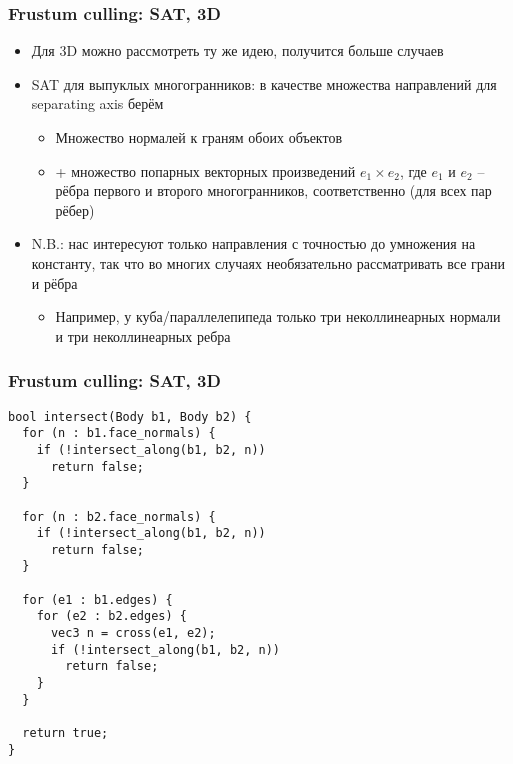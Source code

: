 \documentclass{beamer}
\begin{document}
\begin{frame}[fragile]
\frametitle{Frustum culling: SAT, 3D}
\begin{itemize}
\item Для 3D можно рассмотреть ту же идею, получится больше случаев
\pause
\item SAT для выпуклых многогранников: в качестве множества направлений для separating axis берём
\begin{itemize}
\item Множество нормалей к граням обоих объектов
\item + множество попарных векторных произведений \begin{math}e_1 \times e_2\end{math}, где \begin{math}e_1\end{math} и \begin{math}e_2\end{math} -- рёбра первого и второго многогранников, соответственно (для всех пар рёбер)
\end{itemize}
\pause
\item N.B.: нас интересуют только направления с точностью до умножения на константу, так что во многих случаях необязательно рассматривать все грани и рёбра
\pause
\begin{itemize}
\item Например, у куба/параллелепипеда только три неколлинеарных нормали и три неколлинеарных ребра
\end{itemize}
\end{itemize}
\end{frame}

\begin{frame}[fragile]
\frametitle{Frustum culling: SAT, 3D}
\begin{verbatim}
bool intersect(Body b1, Body b2) {
  for (n : b1.face_normals) {
    if (!intersect_along(b1, b2, n))
      return false;
  }

  for (n : b2.face_normals) {
    if (!intersect_along(b1, b2, n))
      return false;
  }

  for (e1 : b1.edges) {
    for (e2 : b2.edges) {
      vec3 n = cross(e1, e2);
      if (!intersect_along(b1, b2, n))
        return false;
    }
  }

  return true;
}
\end{verbatim}
\end{frame}
\end{document}

